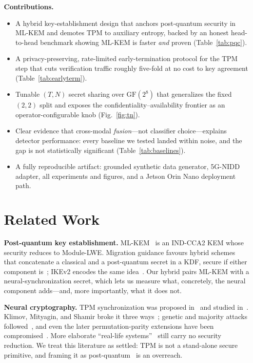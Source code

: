 \documentclass[conference]{IEEEtran}
\begin{document}
\noindent\textbf{Contributions.}
\begin{itemize}
\item A hybrid key-establishment design that anchors post-quantum security in ML-KEM
and demotes TPM to auxiliary entropy, backed by an honest head-to-head benchmark
showing ML-KEM is faster \emph{and} proven (Table~\ref{tab:pqc}).
\item A privacy-preserving, rate-limited early-termination protocol for the TPM step
that cuts verification traffic roughly five-fold at no cost to key agreement
(Table~\ref{tab:earlyterm}).
\item Tunable $(T,N)$ secret sharing over $\mathrm{GF}(2^8)$ that generalizes the
fixed $(2,2)$ split and exposes the confidentiality--availability frontier as an
operator-configurable knob (Fig.~\ref{fig:tn}).
\item Clear evidence that cross-modal \emph{fusion}---not classifier
choice---explains detector performance: every baseline we tested landed within noise,
and the gap is not statistically significant (Table~\ref{tab:baselines}).
\item A fully reproducible artifact: grounded synthetic data generator, 5G-NIDD
adapter, all experiments and figures, and a Jetson Orin Nano deployment path.
\end{itemize}

\section{Related Work}

\textbf{Post-quantum key establishment.}
ML-KEM~\cite{fips203} is an IND-CCA2 KEM whose security reduces to Module-LWE.
Migration guidance favours hybrid schemes that concatenate a classical and a
post-quantum secret in a KDF, secure if either component is~\cite{sp80056c,
stebila2023hybrid}; IKEv2 encodes the same idea~\cite{rfc9370}. Our hybrid pairs
ML-KEM with a neural-synchronization secret, which lets us measure what, concretely,
the neural component adds---and, more importantly, what it does not.

\textbf{Neural cryptography.}
TPM synchronization was proposed in~\cite{kanter2002secure} and studied
in~\cite{rosenzvi2002mutual}. Klimov, Mityagin, and Shamir broke it three
ways~\cite{klimov2002analysis}; genetic and majority attacks
followed~\cite{ruttor2006genetic,shacham2004cooperating,ruttor2007neural}, and even
the later permutation-parity extensions have been
compromised~\cite{seoane2012successful}. More elaborate ``real-life
systems''~\cite{jeong2021generalized} still carry no security reduction. We treat
this literature as settled: TPM is not a stand-alone secure primitive, and framing it
as post-quantum~\cite{stypinski2023smartgrid} is an overreach.
\end{document}
